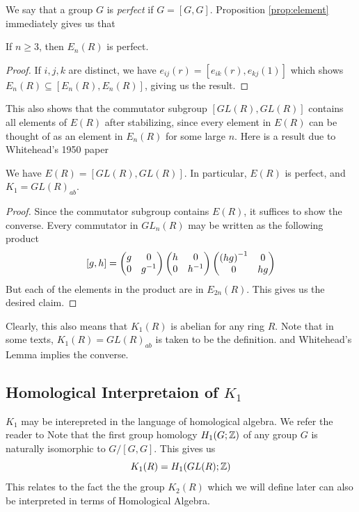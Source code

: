We say that a group $G$ is \emph{perfect} if $G = [G,G]$. Proposition \ref{prop:element}
immediately gives us that
\begin{lemma}
If $n \geq 3$, then $E_n(R)$ is perfect.
\end{lemma}
\begin{proof}
If $i,j,k$ are distinct, we have $e_{ij}(r) = [e_{ik}(r),e_{kj}(1)]$ which shows $E_n(R) \subseteq [E_n(R),E_n(R)]$,
giving us the result.
\end{proof}

This also shows that the commutator subgroup $[GL(R),GL(R)]$ contains all elements of $E(R)$
after stabilizing, since every element in $E(R)$ can be thought of as an element in $E_n(R)$ for some large $n$.
Here is a result due to Whitehead's 1950 paper \cite{WhiteheadSimple}

\begin{lemma}
We have $E(R) = [GL(R), GL(R)]$. In particular, $E(R)$ is perfect, and $K_1 = GL(R)_{ab}$.
\end{lemma}
\begin{proof}
Since the commutator subgroup contains $E(R)$, it suffices to show the converse. 
Every commutator in $GL_n(R)$ may be written as the following product
\[
[g,h] = \begin{pmatrix} g & 0 \\ 0 & g^{-1} \end{pmatrix} \begin{pmatrix} h & 0 \\ 0 & h^{-1} \end{pmatrix} \begin{pmatrix} {(hg)}^{-1} & 0 \\ 0 & hg \end{pmatrix}
\]
But each of the elements in the product are in $E_{2n}(R)$.
This gives us the desired claim.
\end{proof}

Clearly, this also means that $K_1(R)$ is abelian for any ring $R$. 
Note that in some texts, $K_1(R) = GL(R)_{ab}$ is taken to be the definition.
and Whitehead's Lemma implies the converse.

\subsection{Homological Interpretaion of $K_1$}

$K_1$ may be interepreted in the language of homological algebra. We refer the reader to \cite{WeibelHomoAlg} 
Note that the first group homology $H_1(G;\mathbb{Z})$ of any group $G$
is naturally isomorphic to $G/[G,G]$. This gives us
\begin{equation}
K_1(R) = H_1(GL(R);\mathbb{Z})
  \label{eq:K_1 is H_1(GL(R))}
\end{equation}
This relates to the fact the the group $K_2(R)$ which we will define later can also be interpreted
in terms of Homological Algebra.

